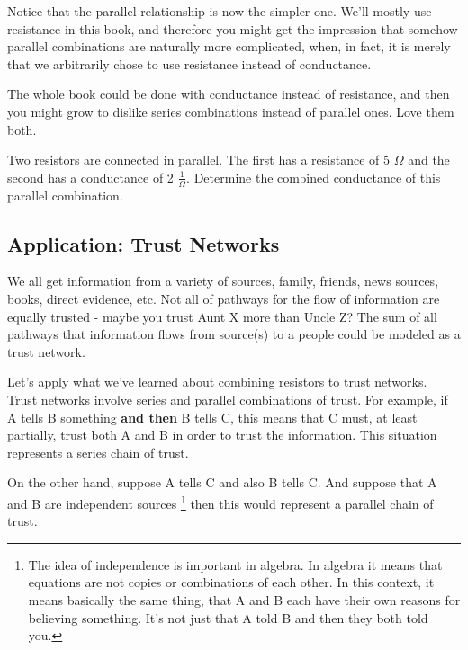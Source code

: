 Notice that the parallel relationship is now the simpler one. We'll mostly use resistance in this book, and therefore you might get the impression that somehow parallel combinations are naturally more complicated, when, in fact, it is merely that we arbitrarily chose to use resistance instead of conductance.\par

The whole book could be done with conductance instead of resistance, and then you might grow to dislike series combinations instead of parallel ones. Love them both.

\begin{blevel}
Two resistors are connected in parallel. The first has a resistance of 5 $\Omega$ and the second has a conductance of 2 $\frac{1}{\Omega}$. Determine the combined conductance of this parallel combination.
\end{blevel}

\subsection{Application: Trust Networks}
We all get information from a variety of sources, family, friends, news sources, books, direct evidence, etc. Not all of pathways for the flow of information are equally trusted - maybe you trust Aunt X more than Uncle Z? The sum of all pathways that information flows from source(s) to a people could be modeled as a trust network.\par 

Let's apply what we've learned about combining resistors to trust networks. Trust networks involve series and parallel combinations of trust. For example, if A tells B something \textbf{and then} B tells C, this means that C must, at least partially, trust both A and B in order to trust the information. This situation represents a series chain of trust.\par

On the other hand, suppose A tells C and also B tells C. And suppose that A and B are independent sources \footnote{The idea of independence is important in algebra. In algebra it means that equations are not copies or combinations of each other. In this context, it means basically the same thing, that A and B each have their own reasons for believing something. It's not just that A told B and then they both told you.} then this would represent a parallel chain of trust.\par

